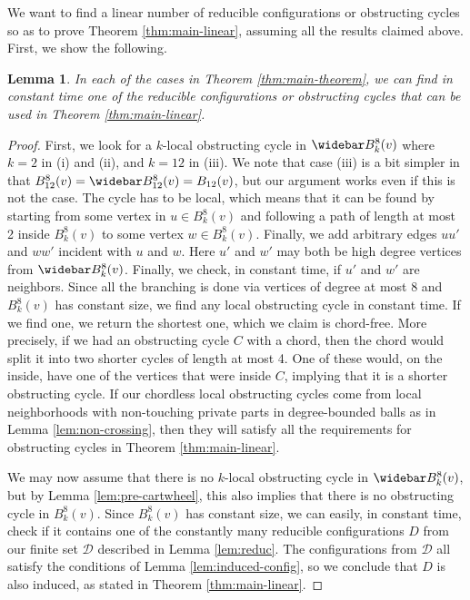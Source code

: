 \documentclass[10pt,a4paper]{article}
\newtheorem{lem}[thm]{Lemma}
\renewcommand{\bar}{\widebar}
\def\cD{{\mathcal D}}
\def\showlabel#1{}
\begin{document}
We want to find a linear number of reducible configurations or obstructing cycles so as to prove
Theorem \ref{thm:main-linear}, assuming all the results claimed above.
First, we show the following.

\begin{lem} \label{lem:local}\showlabel{lem:local}
In each of the cases in Theorem \ref{thm:main-theorem}, we can find in constant time one of the reducible configurations or obstructing cycles that can be used in Theorem \ref{thm:main-linear}. 
\end{lem}

\begin{proof}
First, we look for a $k$-local obstructing cycle in $\bar B^8_k(v)$ where $k=2$ in (i) and (ii), and $k=12$ in (iii).
We note that case (iii) is a bit simpler in that $B_{12}^8(v)=\bar B_{12}^8(v) = B_{12}(v)$, but our argument works even if this is not the case.
The cycle has to be local, which means that it can be found by starting from some vertex in $u\in B^8_k(v)$ and following a path of length at most 2 inside $B^8_k(v)$ to some vertex $w\in B^8_k(v)$. Finally, we add arbitrary edges $uu'$ and $ww'$ incident with $u$ and $w$. Here $u'$ and $w'$ may both be high degree vertices from $\bar B^8_k(v)$.
Finally, we check, in constant time, if $u'$ and $w'$ are neighbors. Since all the branching is done via vertices of degree at most $8$ and $B^8_k(v)$
has constant size, we find any local obstructing cycle in constant time. If we find one, we return the shortest one, which we claim is chord-free. 
More precisely, if we had an obstructing cycle $C$ with a chord, then the chord would split it into two shorter cycles of length at most 4. One of these would, on the inside, have one of the vertices that were inside $C$, implying that it is a shorter obstructing cycle.
If our chordless local obstructing cycles come from local neighborhoods with non-touching private parts in degree-bounded balls as in Lemma \ref{lem:non-crossing}, then they will satisfy all the requirements for obstructing cycles in Theorem \ref{thm:main-linear}.

We may now assume that there
is no $k$-local obstructing cycle in $\bar B^8_k(v)$, but by Lemma \ref{lem:pre-cartwheel}, this also implies that there is no obstructing cycle in $ B^8_k(v)$. Since $B^8_k(v)$ has constant size, we can easily, in constant time, check if it contains one of the constantly many reducible configurations $D$ from our finite set $\cD$ described in Lemma \ref{lem:reduc}. The configurations from $\cD$ all satisfy the conditions of Lemma \ref{lem:induced-config}, so we conclude that  $D$ is also induced, as stated in Theorem \ref{thm:main-linear}.
 

\end{proof}
\end{document}
